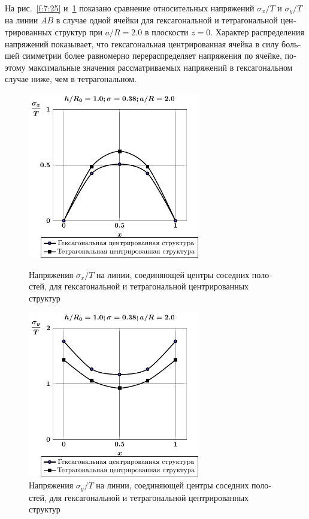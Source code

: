 \begin{russian}
На рис.~\ref{f:7:25} и~\ref{f:7:26} показано сравнение относительных напряжений $\sigma_x/T$ и $\sigma_y/T$ на линии $AB$ в случае одной ячейки для гексагональной и тетрагональной центрированных структур при $a/R=2.0$ в плоскости $z=0$. Характер распределения напряжений показывает, что гексагональная центрированная ячейка в силу большей симметрии более равномерно перераспределяет напряжения по ячейке, поэтому максимальные значения рассматриваемых напряжений в гексагональном случае ниже, чем в тетрагональном.

\begin{figure}[h!]
\centering\footnotesize
\parbox[b]{7.5cm}{\centering\includegraphics[width=7.5cm]{cav7-5-sig_x.pdf}
\caption{Напряжения $\sigma_x/T$ на линии, соединяющей центры соседних полостей, для гексагональной и тетрагональной центрированных структур
\label{f:7:25}}}\hfil\hfil
\parbox[b]{7.5cm}{\centering\includegraphics[width=7.5cm]{cav7-5-sig_y.pdf}
\caption{Напряжения $\sigma_y/T$ на линии, соединяющей центры соседних полостей, для гексагональной и тетрагональной центрированных структур
\label{f:7:26}}}
\end{figure}


\end{russian}
